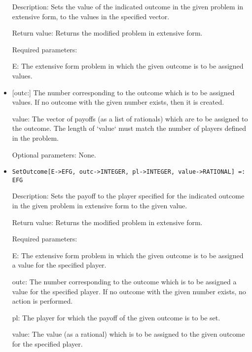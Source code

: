\begin{itemize}
\bd
\item
[Description:] Sets the value of the indicated outcome in the given
problem in extensive form, to the values in the specified vector.
\item
[Return value:] Returns the modified problem in extensive form.
\item
[Required parameters:]\hfil\null
	
\bd
\item
[E:] The extensive form problem in which the given outcome is to be
assigned values.
\item

[outc:] The number corresponding to the outcome which is to be
assigned values.  If no outcome with the given number exists, then it
is created.
\item
[value:] The vector of payoffs (as a list of rationals) which are to
be assigned to the outcome.  The length of `value` must match the
number of players defined in the problem.
\ed

\item
[Optional parameters:] None.
\ed

\item

\protect \large \begin{verbatim} 
SetOutcome[E->EFG, outc->INTEGER, pl->INTEGER, value->RATIONAL] =: EFG
\end{verbatim}\normalsize

\bd
\item
[Description:] Sets the payoff to the player specified for the
indicated outcome in the given problem in extensive form to the given
value.
\item
[Return value:] Returns the modified problem in extensive form.
\item
[Required parameters:]\hfil\null
	
\bd
\item
[E:] The extensive form problem in which the given outcome is to be
assigned a value for the specified player.
\item
[outc:] The number corresponding to the outcome which is to be
assigned a value for the specified player.  If no outcome with the
given number exists, no action is performed.
\item
[pl:] The player for which the payoff of the given outcome is to be
set.
\item
[value:] The value (as a rational) which is to be assigned to the
given outcome for the specified player.
\ed
\ed


\end{itemize}
